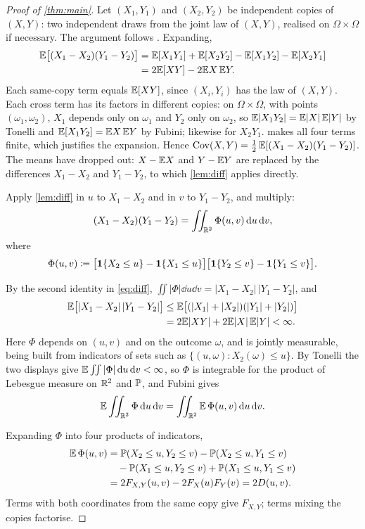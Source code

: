 \documentclass{saim-blog}
\begin{document}
\begin{proof}[Proof of \cref{thm:main}]
Let $(X_1,Y_1)$ and $(X_2,Y_2)$ be independent copies of $(X,Y)$: two independent draws from the joint law of $(X,Y)$, realised on $\Omega\times\Omega$ if necessary. The argument follows \citet{lehmann1966}. Expanding,
\[
\begin{aligned}
\mathbb{E}\big[(X_1-X_2)(Y_1-Y_2)\big]&=\mathbb{E}[X_1Y_1]+\mathbb{E}[X_2Y_2]-\mathbb{E}[X_1Y_2]-\mathbb{E}[X_2Y_1]\\
&=2\mathbb{E}[XY]-2\mathbb{E} X\,\mathbb{E} Y.
\end{aligned}
\]
Each same-copy term equals $\mathbb{E}[XY]$, since $(X_i,Y_i)$ has the law of $(X,Y)$. Each cross term has its factors in different copies: on $\Omega\times\Omega$, with points $(\omega_1,\omega_2)$, $X_1$ depends only on $\omega_1$ and $Y_2$ only on $\omega_2$, so $\mathbb{E}|X_1Y_2|=\mathbb{E}|X|\,\mathbb{E}|Y|$ by Tonelli and $\mathbb{E}[X_1Y_2]=\mathbb{E} X\,\mathbb{E} Y$ by Fubini; likewise for $X_2Y_1$.  makes all four terms finite, which justifies the expansion. Hence $\operatorname{Cov}(X,Y)=\tfrac12\,\mathbb{E}[(X_1-X_2)(Y_1-Y_2)]$. The means have dropped out: $X-\mathbb{E} X$ and $Y-\mathbb{E} Y$ are replaced by the differences $X_1-X_2$ and $Y_1-Y_2$, to which \cref{lem:diff} applies directly.

Apply \cref{lem:diff} in $u$ to $X_1-X_2$ and in $v$ to $Y_1-Y_2$, and multiply:
\begin{equation}\label{eq:product}
(X_1-X_2)(Y_1-Y_2)=\iint_{\mathbb{R}^2}\Phi(u,v)\mathop{}\!\mathrm{d} u\mathop{}\!\mathrm{d} v,
\end{equation}
where
\[
\Phi(u,v)\coloneqq\big[\mathbf{1}\{X_2\le u\}-\mathbf{1}\{X_1\le u\}\big]\big[\mathbf{1}\{Y_2\le v\}-\mathbf{1}\{Y_1\le v\}\big].
\]

By the second identity in \eqref{eq:diff}, $\iint|\Phi|\dd u\dd v=|X_1-X_2|\,|Y_1-Y_2|$, and
\[
\begin{aligned}
\mathbb{E}\big[|X_1-X_2|\,|Y_1-Y_2|\big]&\le\mathbb{E}\big[(|X_1|+|X_2|)(|Y_1|+|Y_2|)\big]\\
&=2\mathbb{E}|XY|+2\mathbb{E}|X|\,\mathbb{E}|Y|<\infty .
\end{aligned}
\]
Here $\Phi$ depends on $(u,v)$ and on the outcome $\omega$, and is jointly measurable, being built from indicators of sets such as $\{(u,\omega):X_2(\omega)\le u\}$. By Tonelli the two displays give $\mathbb{E}\iint|\Phi|\mathop{}\!\mathrm{d} u\mathop{}\!\mathrm{d} v<\infty$, so $\Phi$ is integrable for the product of Lebesgue measure on $\mathbb{R}^2$ and $\mathbb{P}$, and Fubini gives
\[
\mathbb{E}\iint_{\mathbb{R}^2}\Phi\mathop{}\!\mathrm{d} u\mathop{}\!\mathrm{d} v=\iint_{\mathbb{R}^2}\mathbb{E}\,\Phi(u,v)\mathop{}\!\mathrm{d} u\mathop{}\!\mathrm{d} v .
\]

Expanding $\Phi$ into four products of indicators,
\[
\begin{aligned}
\mathbb{E}\,\Phi(u,v)
&=\mathbb{P}(X_2\le u,Y_2\le v)-\mathbb{P}(X_2\le u,Y_1\le v)\\
&\quad-\mathbb{P}(X_1\le u,Y_2\le v)+\mathbb{P}(X_1\le u,Y_1\le v)\\
&=2F_{X,Y}(u,v)-2F_X(u)F_Y(v)=2D(u,v).
\end{aligned}
\]
Terms with both coordinates from the same copy give $F_{X,Y}$; terms mixing the copies factorise.


\end{proof}
\end{document}
